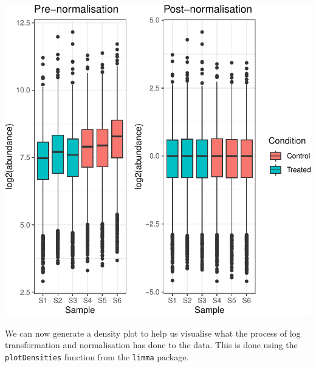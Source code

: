 \documentclass[9pt,a4paper,]{extarticle}
\begin{document}
\begin{center}\includegraphics[height=0.4\textheight]{workflow_expressions_files/figure-latex/tmt_normalisation_2-1} \end{center}

We can now generate a density plot to help us visualise what the process of log
transformation and normalisation has done to the data. This is done using the
\texttt{plotDensities} function from the \texttt{limma} package.
\end{document}
